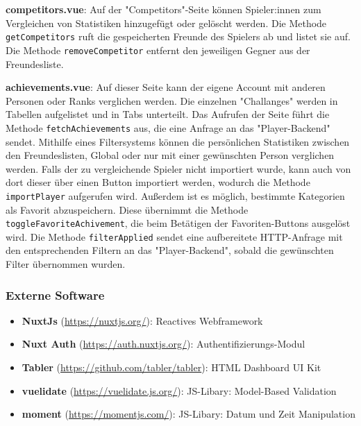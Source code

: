 \textbf{competitors.vue}: Auf der "Competitors"-Seite können Spieler:innen zum Vergleichen von Statistiken hinzugefügt oder gelöscht werden. Die Methode \verb|getCompetitors| ruft die gespeicherten
Freunde des Spielers ab und listet sie auf. Die Methode \verb|removeCompetitor| entfernt den jeweiligen Gegner aus der Freundesliste.
\newline

\textbf{achievements.vue}: Auf dieser Seite kann der eigene Account mit anderen Personen oder Ranks verglichen werden. Die einzelnen "Challanges" werden in Tabellen aufgelistet und in Tabs unterteilt.
Das Aufrufen der Seite führt die Methode \verb|fetchAchievements| aus, die eine Anfrage an das "Player-Backend" sendet. Mithilfe eines Filtersystems können die persönlichen
Statistiken zwischen den Freundeslisten, Global oder nur mit einer gewünschten Person verglichen werden. Falls der zu vergleichende Spieler nicht importiert wurde, kann auch von dort dieser über einen 
Button importiert werden, wodurch die Methode \verb|importPlayer| aufgerufen wird. Außerdem ist es möglich, bestimmte Kategorien als Favorit abzuspeichern. Diese übernimmt die Methode
\verb|toggleFavoriteAchivement|, die beim Betätigen der Favoriten-Buttons ausgelöst wird. Die Methode \verb|filterApplied| sendet eine aufbereitete HTTP-Anfrage mit den entsprechenden Filtern
an das "Player-Backend", sobald die gewünschten Filter übernommen wurden.
\newline

\subsubsection{Externe Software}
\begin{itemize}
    \item \textbf{NuxtJs} (\href{https://nuxtjs.org/}{https://nuxtjs.org/}): Reactives Webframework
    \item \textbf{Nuxt Auth} (\href{https://auth.nuxtjs.org/}{https://auth.nuxtjs.org/}): Authentifizierungs-Modul
    \item \textbf{Tabler} (\href{https://github.com/tabler/tabler}{https://github.com/tabler/tabler}): HTML Dashboard UI Kit
    \item \textbf{vuelidate} (\href{https://vuelidate.js.org/}{https://vuelidate.js.org/}): JS-Libary: Model-Based Validation
    \item \textbf{moment} (\href{https://momentjs.com/}{https://momentjs.com/}): JS-Libary: Datum und Zeit Manipulation
\end{itemize}